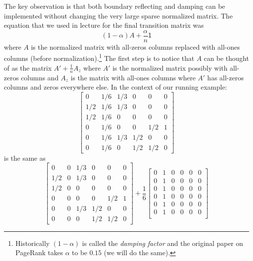\documentclass{article}
\theoremstyle{remark}
\begin{document}
The key observation is that both boundary reflecting and damping can be implemented without changing the very large sparse normalized matrix.
The equation that we used in lecture for the final transition matrix was
\begin{displaymath}
  (1 - \alpha)A + \frac{\alpha}{n}\mathsf 1
\end{displaymath}
where $A$ is the normalized matrix with all-zeros columns replaced with all-ones columns (before normalization).\footnote{Historically $(1 - \alpha)$ is called the \textit{damping factor} and the original paper on PageRank takes $\alpha$ to be $0.15$ (we will do the same).}
The first step is to notice that $A$ can be thought of as the matrix $A' + \frac{1}{n}A_z$ where $A'$ is the normalized matrix possibly with all-zeros columns and $A_z$ is the matrix with all-ones columns where $A'$ has all-zeros columns and zeros everywhere else. In the context of our running example:
\begin{displaymath}
  \begin{bmatrix}
    0 & 1/6 & 1/3 & 0 & 0 & 0 \\
    1/2 & 1/6 & 1/3 & 0 & 0 & 0 \\
    1/2 & 1/6 & 0 & 0 & 0 & 0 \\
    0 & 1/6 & 0 & 0 & 1/2 & 1 \\
    0 & 1/6 & 1/3 & 1/2 & 0 & 0 \\
    0 & 1/6 & 0 & 1/2 & 1/2 & 0
  \end{bmatrix}
\end{displaymath}
is the same as
\begin{displaymath}
  \begin{bmatrix}
    0 & 0 & 1/3 & 0 & 0 & 0 \\
    1/2 & 0 & 1/3 & 0 & 0 & 0 \\
    1/2 & 0 & 0 & 0 & 0 & 0 \\
    0 & 0 & 0 & 0 & 1/2 & 1 \\
    0 & 0 & 1/3 & 1/2 & 0 & 0 \\
    0 & 0 & 0 & 1/2 & 1/2 & 0
  \end{bmatrix}
  +
  \frac{1}{6}
  \begin{bmatrix}
    0 & 1 & 0 & 0 & 0 & 0 \\
    0 & 1 & 0 & 0 & 0 & 0 \\
    0 & 1 & 0 & 0 & 0 & 0 \\
    0 & 1 & 0 & 0 & 0 & 0 \\
    0 & 1 & 0 & 0 & 0 & 0 \\
    0 & 1 & 0 & 0 & 0 & 0 \\
  \end{bmatrix}
\end{displaymath}
\end{document}
